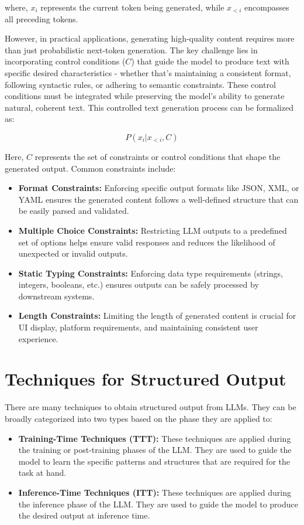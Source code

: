 \documentclass{article}
\begin{document}
where, $x_i$ represents the current token being generated, while $x_{<i}$ encompasses all preceding tokens.

However, in practical applications, generating high-quality content requires more than just probabilistic next-token generation. The key challenge lies in incorporating control conditions ($C$) that guide the model to produce text with specific desired characteristics - whether that's maintaining a consistent format, following syntactic rules, or adhering to semantic constraints. These control conditions must be integrated while preserving the model's ability to generate natural, coherent text. This controlled text generation process can be formalized as:

$$P(x_i | x_{<i}, C)$$

Here, $C$ represents the set of constraints or control conditions that shape the generated output. Common constraints include:

\begin{itemize}
    \item \textbf{Format Constraints:} Enforcing specific output formats like JSON, XML, or YAML ensures the generated content follows a well-defined structure that can be easily parsed and validated.
    \item \textbf{Multiple Choice Constraints:} Restricting LLM outputs to a predefined set of options helps ensure valid responses and reduces the likelihood of unexpected or invalid outputs.
    \item \textbf{Static Typing Constraints:} Enforcing data type requirements (strings, integers, booleans, etc.) ensures outputs can be safely processed by downstream systems.
    \item \textbf{Length Constraints:} Limiting the length of generated content is crucial for UI display, platform requirements, and maintaining consistent user experience.
\end{itemize}

\section{Techniques for Structured Output}

There are many techniques to obtain structured output from LLMs. They can be broadly categorized into two types based on the phase they are applied to:

\begin{itemize}
    \item \textbf{Training-Time Techniques (TTT):} These techniques are applied during the training or post-training phases of the LLM. They are used to guide the model to learn the specific patterns and structures that are required for the task at hand.
    \item \textbf{Inference-Time Techniques (ITT):} These techniques are applied during the inference phase of the LLM. They are used to guide the model to produce the desired output at inference time.
\end{itemize}
\end{document}
